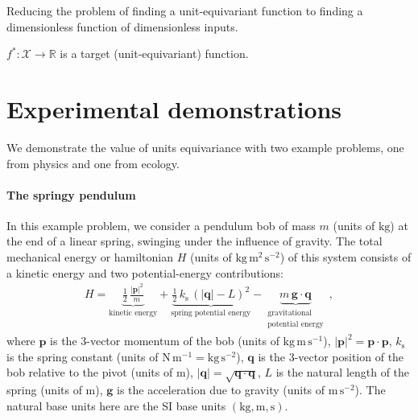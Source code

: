 \documentclass[nohyperref]{article}
\theoremstyle{plain}
\theoremstyle{definition}
\theoremstyle{remark}
\newcommand{\unit}[1]{\mathrm{#1}}
\newcommand{\kg}{\unit{kg}}
\newcommand{\m}{\unit{m}}
\newcommand{\s}{\unit{s}}
\newcommand{\N}{\unit{N}}
\begin{document}
Reducing the problem of finding a unit-equivariant function to finding a dimensionless function of dimensionless inputs.

$f^*: \mathcal X \to \mathbb R$ is a target (unit-equivariant) function.

\section{Experimental demonstrations}

We demonstrate the value of units equivariance with two example problems, one from physics and one from ecology.

\paragraph{The springy pendulum}
In this example problem, we consider a pendulum bob of mass $m$ (units of $\kg$) at the end of a linear spring, swinging under the influence of gravity.
The total mechanical energy or hamiltonian $H$ (units of $\kg\,\m^{2}\,\s^{-2}$) of this system consists of a kinetic energy and two potential-energy contributions:
\begin{align}
    H = \underbrace{\frac{1}{2}\,\frac{|\mathbf{p}|^2}{m}}_{\text{kinetic energy}} + \underbrace{\frac{1}{2}\,k_\text{s}\,(|\mathbf{q}| - L)^2}_{\text{spring potential energy}} - \underbrace{m\,\mathbf{g}\cdot\mathbf{q}}_{\substack{\text{gravitational} \\ \text{potential energy}}} ~,
\end{align}
where $\mathbf{p}$ is the 3-vector momentum of the bob (units of $\kg\,\m\,\s^{-1}$), $|\mathbf{p}|^2 = \mathbf{p}\cdot\mathbf{p}$, $k_\text{s}$ is the spring constant (units of $\N\,\m^{-1}=\kg\,\s^{-2}$), $\mathbf{q}$ is the 3-vector position of the bob relative to the pivot (units of $\m$), $|\mathbf{q}|=\sqrt{\mathbf{q}\cdot\mathbf{q}}$, $L$ is the natural length of the spring (units of $\m$), $\mathbf{g}$ is the acceleration due to gravity (units of $\m\,\s^{-2}$).
The natural base units here are the SI base units $(\kg,\m,\s)$.
\end{document}
